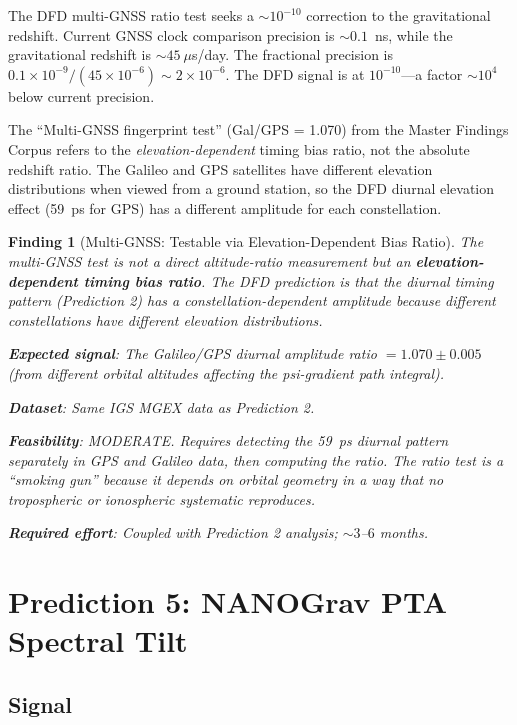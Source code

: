 \documentclass[11pt]{article}
\newtheorem{finding}{Finding}
\newcommand{\ee}[1]{\times 10^{#1}}
\begin{document}
The DFD multi-GNSS ratio test seeks a $\sim 10^{-10}$ correction to the
gravitational redshift. Current GNSS clock comparison precision is
$\sim 0.1$~ns, while the gravitational redshift is $\sim 45~\mu$s/day.
The fractional precision is $0.1\ee{-9}/(45\ee{-6}) \sim 2\ee{-6}$.
The DFD signal is at $10^{-10}$---a factor $\sim 10^4$ below current
precision.

The ``Multi-GNSS fingerprint test'' (Gal/GPS = 1.070) from the Master
Findings Corpus refers to the \emph{elevation-dependent} timing bias
ratio, not the absolute redshift ratio. The Galileo and GPS satellites
have different elevation distributions when viewed from a ground station,
so the DFD diurnal elevation effect (59~ps for GPS) has a different
amplitude for each constellation.

\begin{finding}[Multi-GNSS: Testable via Elevation-Dependent Bias Ratio]
\label{find:GNSS-archival}
The multi-GNSS test is not a direct altitude-ratio measurement but an
\textbf{elevation-dependent timing bias ratio}. The DFD prediction is
that the diurnal timing pattern (Prediction 2) has a constellation-dependent
amplitude because different constellations have different elevation
distributions.

\textbf{Expected signal}: The Galileo/GPS diurnal amplitude ratio
$= 1.070 \pm 0.005$ (from different orbital altitudes affecting the
psi-gradient path integral).

\textbf{Dataset}: Same IGS MGEX data as Prediction 2.

\textbf{Feasibility}: MODERATE. Requires detecting the 59~ps diurnal
pattern separately in GPS and Galileo data, then computing the ratio.
The ratio test is a ``smoking gun'' because it depends on orbital
geometry in a way that no tropospheric or ionospheric systematic
reproduces.

\textbf{Required effort}: Coupled with Prediction 2 analysis;
$\sim 3$--$6$ months.
\end{finding}

\section{Prediction 5: NANOGrav PTA Spectral Tilt}
\label{sec:archival-PTA}

\subsection{Signal}
\end{document}
